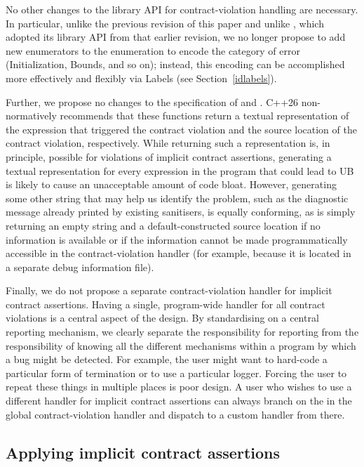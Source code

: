 {No other changes to the library API for contract-violation handling are necessary. In particular, unlike the previous revision of this paper and unlike \cite{P3081R1}, which adopted its library API from that earlier revision, we no longer propose to add new enumerators to the enumeration \mbox{} to encode the category of error (Initialization, Bounds, and so on); instead, this encoding can be accomplished more effectively and flexibly via Labels (see Section~\ref{idlabels}).

Further, we propose no changes to the specification of  and . C++26 non-normatively recommends that these functions return a textual representation of the expression that triggered the contract violation and the source location of the contract violation, respectively. While returning such a representation is, in principle, possible for violations of implicit contract assertions, generating a textual representation for every expression in the program that could lead to UB is likely to cause an unacceptable amount of code bloat. However, generating some other string that may help us identify the problem, such as the diagnostic message already printed by existing sanitisers, is equally conforming, as is simply returning an empty string and a default-constructed source location if no information is available or if the information cannot be made programmatically accessible in the contract-violation handler (for example,
because it is located in a separate debug information file). 

Finally, we do not propose a separate contract-violation handler for implicit contract assertions. Having a single, program-wide handler for all contract violations is a central aspect of the \cite{P2900R14} design. By standardising on a central reporting mechanism, we clearly separate the responsibility for reporting from the responsibility of knowing all the different mechanisms within a program by which a bug might be detected. For example, the user might want to hard-code a particular form of termination or to use a particular logger. Forcing the user to repeat these things in multiple places is poor design. A user who wishes to use a different handler for implicit contract assertions can always branch on the  in the global contract-violation handler and dispatch to a custom handler from there.

\subsection{Applying implicit contract assertions}
\label{applyicas}

}
